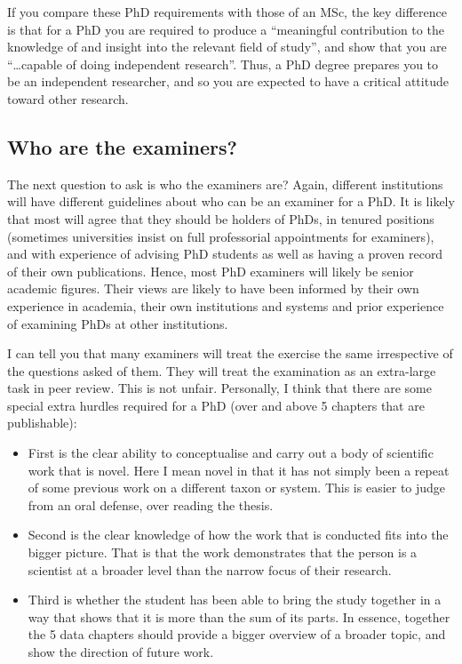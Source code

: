\documentclass[
]{krantz}
\providecommand{\tightlist}{%
  \setlength{\itemsep}{0pt}\setlength{\parskip}{0pt}}
\begin{document}
If you compare these PhD requirements with those of an MSc, the key difference is that for a PhD you are required to produce a ``meaningful contribution to the knowledge of and insight into the relevant field of study'', and show that you are ``\ldots capable of doing independent research''. Thus, a PhD degree prepares you to be an independent researcher, and so you are expected to have a critical attitude toward other research.

\hypertarget{who-are-the-examiners}{%
\subsection{Who are the examiners?}\label{who-are-the-examiners}}

The next question to ask is who the examiners are? Again, different institutions will have different guidelines about who can be an examiner for a PhD. It is likely that most will agree that they should be holders of PhDs, in tenured positions (sometimes universities insist on full professorial appointments for examiners), and with experience of advising PhD students as well as having a proven record of their own publications. Hence, most PhD examiners will likely be senior academic figures. Their views are likely to have been informed by their own experience in academia, their own institutions and systems and prior experience of examining PhDs at other institutions.

I can tell you that many examiners will treat the exercise the same irrespective of the questions asked of them. They will treat the examination as an extra-large task in peer review. This is not unfair. Personally,
I think that there are some special extra hurdles required for a PhD (over and above 5 chapters that are publishable):

\begin{itemize}
\tightlist
\item
  First is the clear ability to conceptualise and carry out a body of scientific work that is novel. Here I mean novel in that it has not simply been a repeat of some previous work on a different taxon or system. This is easier to judge from an oral defense, over reading the thesis.
\item
  Second is the clear knowledge of how the work that is conducted fits into the bigger picture. That is that the work demonstrates that the person is a scientist at a broader level than the narrow focus of their research.
\item
  Third is whether the student has been able to bring the study together in a way that shows that it is more than the sum of its parts. In essence, together the 5 data chapters should provide a bigger overview of a broader topic, and show the direction of future work.
\end{itemize}
\end{document}

